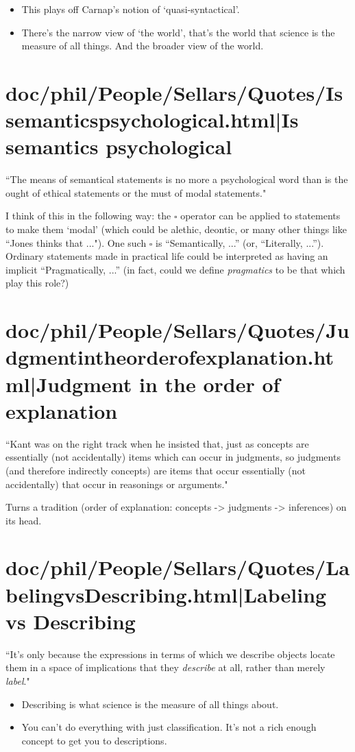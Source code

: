 \documentclass[12pt,a4paper]{report}
\begin{document}
\begin{itemize}
    \item This plays off Carnap's notion of `quasi-syntactical'.
    \item There's the narrow view of `the world', that's the world that science
          is the measure of all things. And the broader view of the world.
\end{itemize}

\section{doc/phil/People/Sellars/Quotes/Issemanticspsychological.html|Is semantics psychological}
``The means of semantical statements is no more a psychological word than is
the ought of ethical statements or the must of modal statements."

I think of this in the following way: the $\square$ operator can be applied to
statements to make them `modal' (which could be alethic, deontic, or many other
things like ``Jones thinks that ..."). One such $\square$ is ``Semantically,
...'' (or, ``Literally, ...''). Ordinary statements made in practical life
 could be interpreted as having an implicit ``Pragmatically, ...'' (in fact,
 could we define \emph{pragmatics} to be that which play this role?)
\section{doc/phil/People/Sellars/Quotes/Judgmentintheorderofexplanation.html|Judgment in the order of explanation}

``Kant was on the right track when he insisted that, just as concepts are
essentially (not accidentally) items which can occur in judgments, so judgments
(and therefore indirectly concepts) are items that occur essentially (not
accidentally) that occur in reasonings or arguments."

Turns a tradition (order of explanation: concepts -> judgments -> inferences)
on its head.

\section{doc/phil/People/Sellars/Quotes/LabelingvsDescribing.html|Labeling vs Describing}
``It's only because the expressions in terms of which we describe objects locate
them in a space of implications that they \emph{describe} at all, rather than
merely \emph{label}."

\begin{itemize}
    \item Describing is what science is the measure of all things about.
    \item You can't do everything with just classification. It's not a rich
         enough concept to get you to descriptions.
\end{itemize}
\end{document}
